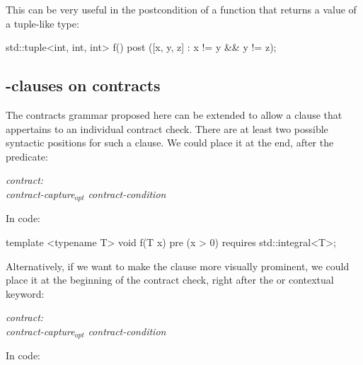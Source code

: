 This can be very useful in the postcondition of a function that returns a value of a tuple-like type:

\begin{codeblock}
std::tuple<int, int, int> f()
  post ([x, y, z] : x != y && y != z);
\end{codeblock}



\subsection{-clauses on contracts}
\label{subsec:requires}

The contracts grammar proposed here can be extended to allow a  clause that appertains to an individual contract check. There are at least two possible syntactic positions for such a  clause. We could place it at the end, after the predicate:

\begin{adjustwidth}{0.5cm}{0.5cm}
\emph{contract:} \\
\phantom{~~~}\emph{contract-capture}$_{opt}$ \emph{contract-condition} 

\end{adjustwidth}

In code:

\begin{codeblock}
template <typename T>
void f(T x)
  pre (x > 0) requires std::integral<T>;
\end{codeblock}

Alternatively, if we want to make the  clause more visually prominent, we could place it at the beginning of the contract check, right after the  or  contextual keyword:

\begin{adjustwidth}{0.5cm}{0.5cm}

\emph{contract:} \\
\phantom{~~~} \emph{contract-capture}$_{opt}$ \emph{contract-condition}

\end{adjustwidth}

In code:

